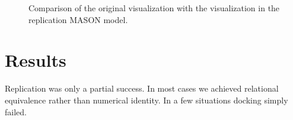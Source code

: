 \documentclass[runningheads,a4paper]{llncs}
\begin{document}
\begin{figure}
\centering

\caption{Comparison of the original visualization with the visualization in the replication MASON model. }
\label{fig:gui-comparison}
\end{figure}


\section{Results}
Replication was only a partial success. 
In most cases we achieved relational equivalence \cite{springerlink:10.1007/BF01299065} rather than numerical identity.
In a few situations docking simply failed.
\end{document}
